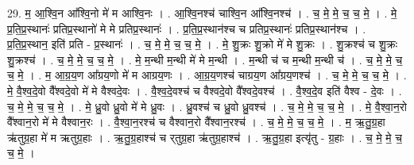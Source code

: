 \documentclass[17pt]{extarticle}
\begin{document}
29. म॒ आ॒श्वि॒न आ᳚श्वि॒नो मे॑ म आश्वि॒नः । . आ॒श्वि॒नश्च॑ चाश्वि॒न आ᳚श्वि॒नश्च॑ । . च॒ मे॒ मे॒ च॒ च॒ मे॒ । . मे॒ प्र॒ति॒प्र॒स्थानः॑ प्रतिप्र॒स्थानो॑ मे मे प्रतिप्र॒स्थानः॑ । . प्र॒ति॒प्र॒स्थान॑श्च च प्रतिप्र॒स्थानः॑ प्रतिप्र॒स्थान॑श्च । . प्र॒ति॒प्र॒स्थान॒ इति॑ प्रति - प्र॒स्थानः॑ । . च॒ मे॒ मे॒ च॒ च॒ मे॒ । . मे॒ शु॒क्रः शु॒क्रो मे॑ मे शु॒क्रः । . शु॒क्रश्च॑ च शु॒क्रः शु॒क्रश्च॑ । . च॒ मे॒ मे॒ च॒ च॒ मे॒ । . मे॒ म॒न्थी म॒न्थी मे॑ मे म॒न्थी । . म॒न्थी च॑ च म॒न्थी म॒न्थी च॑ । . च॒ मे॒ मे॒ च॒ च॒ मे॒ । . म॒ आ॒ग्र॒य॒ण आ᳚ग्रय॒णो मे॑ म आग्रय॒णः । . आ॒ग्र॒य॒णश्च॑ चाग्रय॒ण आ᳚ग्रय॒णश्च॑ । . च॒ मे॒ मे॒ च॒ च॒ मे॒ । . मे॒ वै॒श्व॒दे॒वो वै᳚श्वदे॒वो मे॑ मे वैश्वदे॒वः । . वै॒श्व॒दे॒वश्च॑ च वैश्वदे॒वो वै᳚श्वदे॒वश्च॑ । . वै॒श्व॒दे॒व इति॑ वैश्व - दे॒वः । . च॒ मे॒ मे॒ च॒ च॒ मे॒ । . मे॒ ध्रु॒वो ध्रु॒वो मे॑ मे ध्रु॒वः । . ध्रु॒वश्च॑ च ध्रु॒वो ध्रु॒वश्च॑ । . च॒ मे॒ मे॒ च॒ च॒ मे॒ । . मे॒ वै॒श्वा॒न॒रो वै᳚श्वान॒रो मे॑ मे वैश्वान॒रः । . वै॒श्वा॒न॒रश्च॑ च वैश्वान॒रो वै᳚श्वान॒रश्च॑ । . च॒ मे॒ मे॒ च॒ च॒ मे॒ । . म॒ ऋ॒तु॒ग्र॒हा ऋ॑तुग्र॒हा मे॑ म ऋतुग्र॒हाः । . ऋ॒तु॒ग्र॒हाश्च॑ च र्‌तुग्र॒हा ऋ॑तुग्र॒हाश्च॑ । . ऋ॒तु॒ग्र॒हा इत्यृ॑तु - ग्र॒हाः । . च॒ मे॒ मे॒ च॒ च॒ मे॒ । \newline
\end{document}
